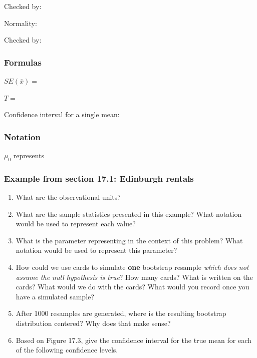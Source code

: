 \documentclass[
]{report}
\newcommand{\rgs}{\vspace{12pt}} %
\newcommand{\rgi}{\hspace{24pt}}  %
\begin{document}
\rgi \rgi Checked by:
\rgs 

\rgi Normality:
\rgs 

\rgi \rgi Checked by:
\rgs 

\hypertarget{formulas-3}{%
\subsubsection*{Formulas}\label{formulas-3}}

\(SE(\overline{x})=\)
\rgs 

\(T=\)
\rgs 

Confidence interval for a single mean:
\rgs 

\hypertarget{notation-2}{%
\subsubsection*{Notation}\label{notation-2}}

\(\mu_0\) represents
\rgs 

\hypertarget{example-from-section-17.1-edinburgh-rentals}{%
\subsubsection*{Example from section 17.1: Edinburgh rentals}\label{example-from-section-17.1-edinburgh-rentals}}

\begin{enumerate}
\def\labelenumi{\arabic{enumi}.}
\item
  What are the observational units?
  \rgs 
\item
  What are the sample statistics presented in this example? What notation would be used to represent each value?
  \rgs 
\item
  What is the parameter representing in the context of this problem? What notation would be used to represent this parameter?
  \rgs 
  \rgs 
\item
  How could we use cards to simulate \textbf{one} bootstrap resample \emph{which does not assume the null hypothesis is true}? How many cards? What is written on the cards? What would we do with the cards? What would you record once you have a simulated sample?
  \rgs 
  \rgs 
  \rgs 
\item
  After 1000 resamples are generated, where is the resulting bootstrap distribution centered? Why does that make sense?
  \rgs 
  \rgs 
\item
  Based on Figure 17.3, give the confidence interval for the true mean for each of the following confidence levels.
\end{enumerate}
\end{document}
